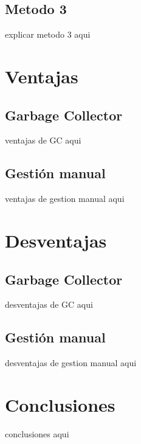 \documentclass[11pt]{article} %
\begin{document}
\subsection{Metodo 3}
explicar metodo 3 aqui

\section{Ventajas}

\subsection{Garbage Collector}

ventajas de GC aqui

\subsection{Gestión manual}

ventajas de gestion manual aqui

\section{Desventajas}

\subsection{Garbage Collector}

desventajas de GC aqui

\subsection{Gestión manual}

desventajas de gestion manual aqui

\section{Conclusiones}

conclusiones aqui
\end{document}
